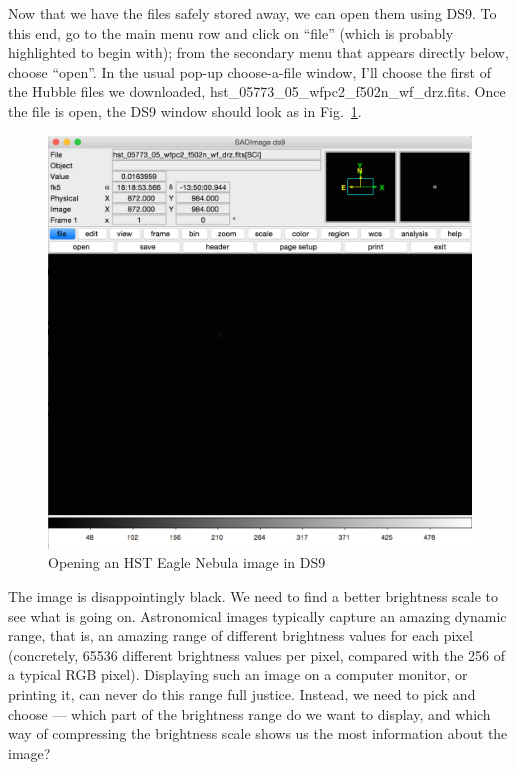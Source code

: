 \documentclass[twocolumn,apj]{openjournal}
\begin{document}
Now that we have the files safely stored away, we can open them using DS9. To this end, go to the main menu row and click on ``file'' (which is probably highlighted to begin with); from the secondary menu that appears directly below, choose ``open''. In the usual pop-up choose-a-file window, I'll choose the first of the Hubble files we downloaded, hst\_05773\_05\_wfpc2\_f502n\_wf\_drz.fits. Once the file is open, the DS9 window should look as in Fig.~\ref{EagleOpen1}.
\begin{figure}[htbp]
\begin{center}
\includegraphics[width=\linewidth]{ds9-eagle1.jpg}
\caption{Opening an HST Eagle Nebula image in DS9}
\label{EagleOpen1}
\end{center}
\end{figure}

The image is disappointingly black. We need to find a better brightness scale to see what is going on. Astronomical images typically capture an amazing dynamic range, that is, an amazing range of different brightness values for each pixel (concretely, 65536 different brightness values per pixel, compared with the 256 of a typical RGB pixel). Displaying such an image on a computer monitor, or printing it, can never do this range full justice. Instead, we need to pick and choose --- which part of the brightness range do we want to display, and which way of compressing the brightness scale shows us the most information about the image?
\end{document}
